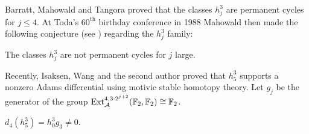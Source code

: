





Barratt, Mahowald and Tangora \cite{BMT} proved that the classes $h_j^3$ are permanent cycles for $j \leq 4$. At Toda's $60^{\mathrm{th}}$ birthday conference in 1988 Mahowald then made the following conjecture (see \cite[Remark~3.1]{Minami}) regarding the $h_j^3$ family:


\begin{cnj}[Mahowald] \label{conj Mahowald}
The classes $h_j^3$ are not permanent cycles for $j$ large.
\end{cnj}

Recently, Isaksen, Wang and the second author proved that $h_5^3$ supports a nonzero Adams differential using motivic stable homotopy theory. Let $g_j$ be the generator of the group $\operatorname{\mathrm{Ext}}^{4, 3 \cdot 2^{j+2}}_{\operatorname{\mathcal{A}}}(\mathbb{F}_2, \mathbb{F}_2) \cong \mathbb{F}_2$.
    
\begin{thm}\label{thm: d4 h53}
  $d_4(h_5^3) = h_0^3 g_3 \neq 0$.
\end{thm}

